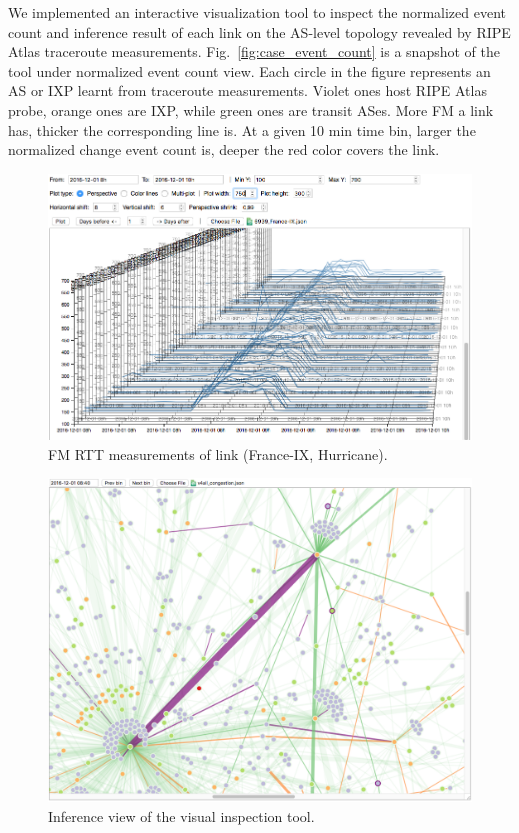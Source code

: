 We implemented an interactive visualization tool to inspect the normalized event count and inference result of each link on the AS-level topology revealed by RIPE Atlas traceroute measurements.
Fig.~\ref{fig:case_event_count} is a snapshot of the tool under normalized event count view.
Each circle in the figure represents an AS or IXP learnt from traceroute measurements. Violet ones host RIPE Atlas probe, orange ones are IXP, while green ones are transit ASes. More \ac{FM} a link has, thicker the corresponding line is. At a given 10 min time bin, larger the normalized change event count is, deeper the red color covers the link.

\begin{figure}[!htb]
\centering
\includegraphics[width=1\textwidth]{gfx/chap5/case_multi_rtt.png}
\caption{\ac{FM} RTT measurements of link (France-IX, Hurricane).}
\label{fig:case_multi_rtt}
\end{figure}

\begin{figure}[!htb]
\centering
\includegraphics[width=1\textwidth]{gfx/chap5/case_infer_res.png}
\caption{Inference view of the visual inspection tool.}
\label{fig:case_infer_res}
\end{figure}

